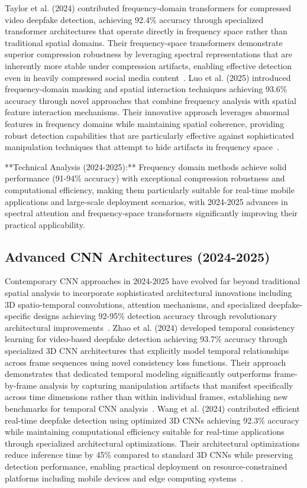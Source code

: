 \documentclass[conference]{IEEEtran}
\begin{document}
Taylor et al. (2024) contributed frequency-domain transformers for compressed video deepfake detection, achieving 92.4\% accuracy through specialized transformer architectures that operate directly in frequency space rather than traditional spatial domains. 
Their frequency-space transformers demonstrate superior compression robustness by leveraging spectral representations that are inherently more stable under compression artifacts, enabling effective detection even in heavily compressed social media content~\cite{taylor2024frequency}.
Luo et al. (2025) introduced frequency-domain masking and spatial interaction techniques achieving 93.6\% accuracy through novel approaches that combine frequency analysis with spatial feature interaction mechanisms. 
Their innovative approach leverages abnormal features in frequency domains while maintaining spatial coherence, providing robust detection capabilities that are particularly effective against sophisticated manipulation techniques that attempt to hide artifacts in frequency space~\cite{luo2025frequency}.

**Technical Analysis (2024-2025):** Frequency domain methods achieve solid performance (91-94\% accuracy) with exceptional compression robustness and computational efficiency, making them particularly suitable for real-time mobile applications and large-scale deployment scenarios, with 2024-2025 advances in spectral attention and frequency-space transformers significantly improving their practical applicability.

\subsection{Advanced CNN Architectures (2024-2025)}
Contemporary CNN approaches in 2024-2025 have evolved far beyond traditional spatial analysis to incorporate sophisticated architectural innovations including 3D spatio-temporal convolutions, attention mechanisms, and specialized deepfake-specific designs achieving 92-95\% detection accuracy through revolutionary architectural improvements~\cite{zhao2024temporal,wang2024efficient,huang2024hybrid,ahmad2024fame}.
Zhao et al. (2024) developed temporal consistency learning for video-based deepfake detection achieving 93.7\% accuracy through specialized 3D CNN architectures that explicitly model temporal relationships across frame sequences using novel consistency loss functions. Their approach demonstrates that dedicated temporal modeling significantly outperforms frame-by-frame analysis by capturing manipulation artifacts that manifest specifically across time dimensions rather than within individual frames, establishing new benchmarks for temporal CNN analysis~\cite{zhao2024temporal}.
Wang et al. (2024) contributed efficient real-time deepfake detection using optimized 3D CNNs achieving 92.3\% accuracy while maintaining computational efficiency suitable for real-time applications through specialized architectural optimizations. Their architectural optimizations reduce inference time by 45\% compared to standard 3D CNNs while preserving detection performance, enabling practical deployment on resource-constrained platforms including mobile devices and edge computing systems~\cite{wang2024efficient}.
\end{document}
